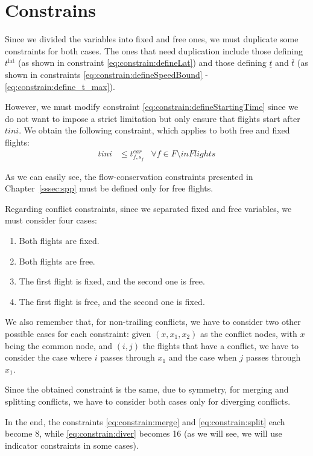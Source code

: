 \documentclass[../thesis.tex]{subfiles}
\begin{document}
\section{Constrains}
Since we divided the variables into fixed and free ones, we must duplicate some constraints for both cases.  
The ones that need duplication include those defining $t^\text{lat}$ (as shown in constraint \ref{eq:constrain:defineLat}) and those defining $\underline t$ and $\overline t$ (as shown in constraints \ref{eq:constrain:defineSpeedBound} - \ref{eq:constrain:define_t_max}).  

However, we must modify constraint \ref{eq:constrain:defineStartingTime} since we do not want to impose a strict limitation but only ensure that flights start after $tini$.  
We obtain the following constraint, which applies to both free and fixed flights:  
\begin{align}\label{eq:constrain:MercedesStart}
tini &\leq t^{ear}_{f,s_f} &\forall f \in F \setminus inFlights
\end{align}  

As we can easily see, the flow-conservation constraints presented in Chapter~\ref{sssec:spp} must be defined only for free flights.  

Regarding conflict constraints, since we separated fixed and free variables, we must consider four cases:  
\begin{enumerate}
    \item Both flights are fixed.
    \item Both flights are free.
    \item The first flight is fixed, and the second one is free.
    \item The first flight is free, and the second one is fixed.
\end{enumerate}  

We also remember that, for non-trailing conflicts, we have to consider two other possible cases for each constraint: given $(x,x_1,x_2)$ as the conflict nodes, with $x$ being the common node, and $(i,j)$ the flights that have a conflict, we have to consider the case where $i$ passes through $x_1$ and the case when $j$ passes through $x_1$.

Since the obtained constraint is the same, due to symmetry, for merging and splitting conflicts, we have to consider both cases only for diverging conflicts.

In the end, the constraints \ref{eq:constrain:merge} and \ref{eq:constrain:split} each become 8, while \ref{eq:constrain:diver} becomes 16 (as we will see, we will use indicator constraints in some cases).
\end{document}
